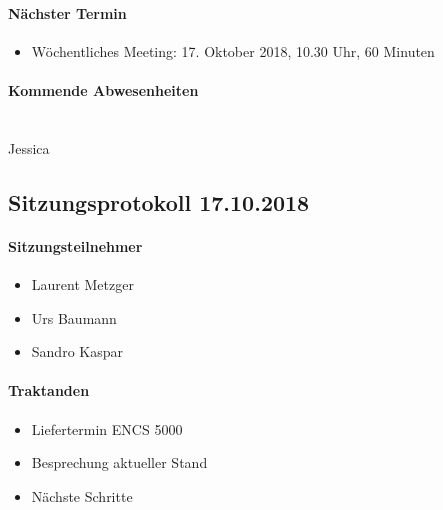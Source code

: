 \paragraph{Nächster Termin}
\begin{itemize}	
	\item Wöchentliches Meeting: 17. Oktober 2018, 10.30 Uhr, 60 Minuten
\end{itemize}

\paragraph{Kommende Abwesenheiten} \mbox{}\\
Jessica

\newpage





\subsection{Sitzungsprotokoll 17.10.2018}

\paragraph{Sitzungsteilnehmer}
\begin{itemize}	
	\item Laurent Metzger 
	\item Urs Baumann
	\item Sandro Kaspar
\end{itemize}

\paragraph{Traktanden}
\begin{itemize}	
	\item Liefertermin ENCS 5000
	\item Besprechung aktueller Stand
	\item Nächste Schritte
\end{itemize}

